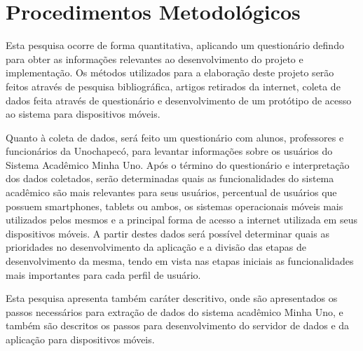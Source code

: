 \section{Procedimentos Metodológicos}

Esta pesquisa ocorre de forma quantitativa, aplicando um questionário defindo para obter as informações relevantes ao desenvolvimento do projeto e implementação. Os métodos utilizados para a elaboração deste projeto serão feitos através de pesquisa bibliográfica, artigos retirados da internet, coleta de dados feita através de questionário e desenvolvimento de um protótipo de acesso ao sistema para dispositivos móveis.

Quanto à coleta de dados, será feito um questionário com alunos, professores e funcionários da Unochapecó, para levantar informações sobre os usuários do Sistema Acadêmico Minha Uno.  Após o término do questionário e interpretação dos dados coletados, serão determinadas quais as funcionalidades do sistema acadêmico são mais relevantes para seus usuários, percentual de usuários que possuem smartphones, tablets ou ambos, os sistemas operacionais móveis mais utilizados pelos mesmos e a principal forma de acesso a internet utilizada em seus dispositivos móveis. A partir destes dados será possível determinar quais as prioridades no desenvolvimento da aplicação e a divisão das etapas de desenvolvimento da mesma, tendo em vista nas etapas iniciais as funcionalidades mais importantes para cada perfil de usuário.

Esta pesquisa apresenta também caráter descritivo, onde são apresentados os passos necessários para extração de dados do sistema acadêmico Minha Uno, e também são descritos os passos para desenvolvimento do servidor de dados e da aplicação para dispositivos móveis.

